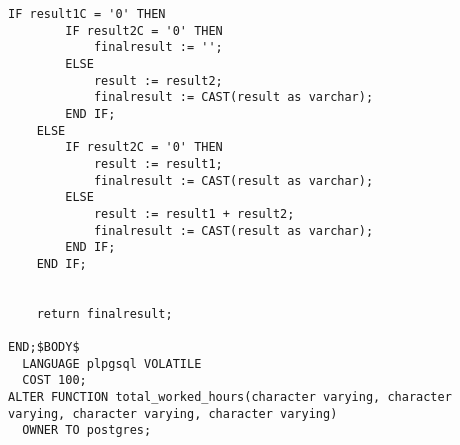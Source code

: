 \begin{appendices}
\begin{Verbatim}[fontsize=\tiny]
    IF result1C = '0' THEN
        IF result2C = '0' THEN
            finalresult := '';
        ELSE 
            result := result2;
            finalresult := CAST(result as varchar);
        END IF;
    ELSE
        IF result2C = '0' THEN
            result := result1;
            finalresult := CAST(result as varchar);
        ELSE
            result := result1 + result2;
            finalresult := CAST(result as varchar);
        END IF;
    END IF;
  
    
    return finalresult;
   
END;$BODY$
  LANGUAGE plpgsql VOLATILE
  COST 100;
ALTER FUNCTION total_worked_hours(character varying, character varying, character varying, character varying)
  OWNER TO postgres;
\end{Verbatim}


\end{appendices}